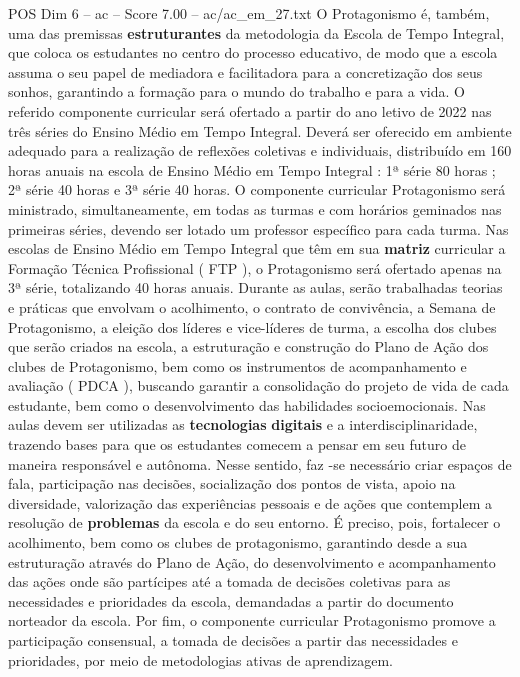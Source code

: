 \begin{textsample}{POS Dim 6 – ac – Score 7.00 – ac/ac\_em\_27.txt}
O Protagonismo é, também, uma das premissas \textbf{estruturantes} da metodologia da Escola de Tempo Integral, que coloca os estudantes no centro do processo educativo, de modo que a escola assuma o seu papel de mediadora e facilitadora para a concretização dos seus sonhos, garantindo a formação para o mundo do trabalho e para a vida.
O referido componente curricular será ofertado a partir do ano letivo de 2022 nas três séries do Ensino Médio em Tempo Integral.
Deverá ser oferecido em ambiente adequado para a realização de reflexões coletivas e individuais, distribuído em 160 horas anuais na escola de Ensino Médio em Tempo Integral : 1ª série 80 horas ; 2ª série 40 horas e 3ª série 40 horas.
O componente curricular Protagonismo será ministrado, simultaneamente, em todas as turmas e com horários geminados nas primeiras séries, devendo ser lotado um professor específico para cada turma.
Nas escolas de Ensino Médio em Tempo Integral que têm em sua \textbf{matriz} curricular a Formação Técnica Profissional ( FTP ), o Protagonismo será ofertado apenas na 3ª série, totalizando 40 horas anuais.
Durante as aulas, serão trabalhadas teorias e práticas que envolvam o acolhimento, o contrato de convivência, a Semana de Protagonismo, a eleição dos líderes e vice-líderes de turma, a escolha dos clubes que serão criados na escola, a estruturação e construção do Plano de Ação dos clubes de Protagonismo, bem como os instrumentos de acompanhamento e avaliação ( PDCA ), buscando garantir a consolidação do projeto de vida de cada estudante, bem como o desenvolvimento das habilidades socioemocionais.
Nas aulas devem ser utilizadas as \textbf{tecnologias} \textbf{digitais} e a interdisciplinaridade, trazendo bases para que os estudantes comecem a pensar em seu futuro de maneira responsável e autônoma.
Nesse sentido, faz -se necessário criar espaços de fala, participação nas decisões, socialização dos pontos de vista, apoio na diversidade, valorização das experiências pessoais e de ações que contemplem a resolução de \textbf{problemas} da escola e do seu entorno.
É preciso, pois, fortalecer o acolhimento, bem como os clubes de protagonismo, garantindo desde a sua estruturação através do Plano de Ação, do desenvolvimento e acompanhamento das ações onde são partícipes até a tomada de decisões coletivas para as necessidades e prioridades da escola, demandadas a partir do documento norteador da escola.
Por fim, o componente curricular Protagonismo promove a participação consensual, a tomada de decisões a partir das necessidades e prioridades, por meio de metodologias ativas de aprendizagem.

\end{textsample}
